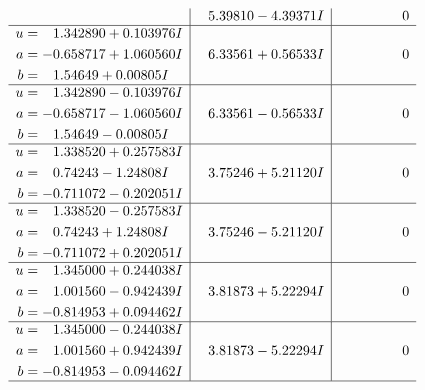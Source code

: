 \documentclass[1p]{elsarticle_modified}
\theoremstyle{definition}
\begin{document}
$$\begin{array}{c|c|c}
 & \phantom{-}5.39810 - 4.39371 I & \phantom{-0.000000 } 0 \\ \hline\begin{aligned}
u &= \phantom{-}1.342890 + 0.103976 I \\
a &= -0.658717 + 1.060560 I \\
b &= \phantom{-}1.54649 + 0.00805 I\end{aligned}
 & \phantom{-}6.33561 + 0.56533 I & \phantom{-0.000000 } 0 \\ \hline\begin{aligned}
u &= \phantom{-}1.342890 - 0.103976 I \\
a &= -0.658717 - 1.060560 I \\
b &= \phantom{-}1.54649 - 0.00805 I\end{aligned}
 & \phantom{-}6.33561 - 0.56533 I & \phantom{-0.000000 } 0 \\ \hline\begin{aligned}
u &= \phantom{-}1.338520 + 0.257583 I \\
a &= \phantom{-}0.74243 - 1.24808 I \\
b &= -0.711072 - 0.202051 I\end{aligned}
 & \phantom{-}3.75246 + 5.21120 I & \phantom{-0.000000 } 0 \\ \hline\begin{aligned}
u &= \phantom{-}1.338520 - 0.257583 I \\
a &= \phantom{-}0.74243 + 1.24808 I \\
b &= -0.711072 + 0.202051 I\end{aligned}
 & \phantom{-}3.75246 - 5.21120 I & \phantom{-0.000000 } 0 \\ \hline\begin{aligned}
u &= \phantom{-}1.345000 + 0.244038 I \\
a &= \phantom{-}1.001560 - 0.942439 I \\
b &= -0.814953 + 0.094462 I\end{aligned}
 & \phantom{-}3.81873 + 5.22294 I & \phantom{-0.000000 } 0 \\ \hline\begin{aligned}
u &= \phantom{-}1.345000 - 0.244038 I \\
a &= \phantom{-}1.001560 + 0.942439 I \\
b &= -0.814953 - 0.094462 I\end{aligned}
 & \phantom{-}3.81873 - 5.22294 I & \phantom{-0.000000 } 0\\
 \hline 
 \end{array}$$\newpage$$\begin{array}{c|c|c}  

\end{array}$$
\end{document}
